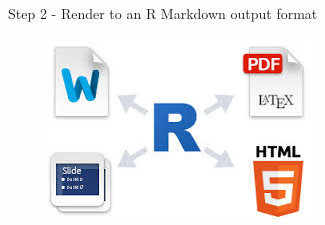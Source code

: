 \documentclass[final]{beamer}
\begin{document}
\begin{frame}[fragile]
\begin{columns}[t]
\begin{column}{0.31\linewidth}
\begin{minipage}[t][.955\textheight]{\linewidth}
\begin{block}{Step 2 - Render to an R Markdown output format}
\vspace{0ex}
\begin{figure}
\includegraphics[width=0.98\linewidth]{images/RMarkdownOutput4way.png}
\end{figure}
\vspace{1ex}
\end{block}


\end{minipage}
\end{column}
\end{columns}
\end{frame}
\end{document}
